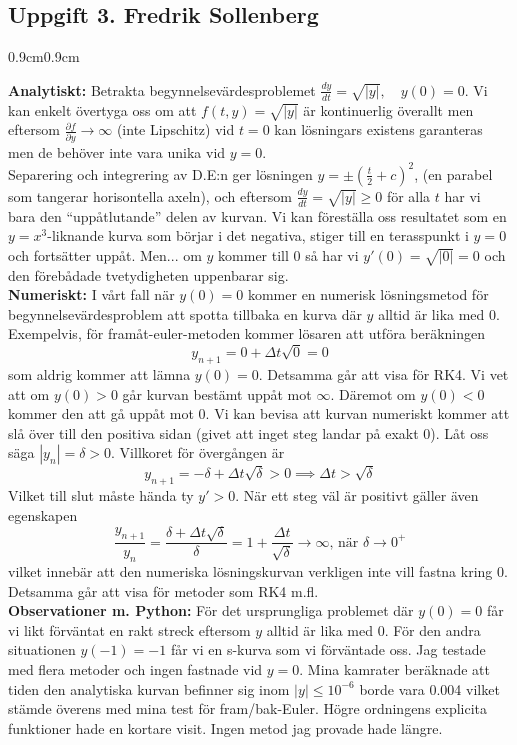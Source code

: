 \documentclass{article}
\begin{document}
\subsection*{Uppgift 3. Fredrik Sollenberg}
\begin{adjustwidth}{0.9cm}{0.9cm}

\textbf{Analytiskt:} Betrakta begynnelsevärdesproblemet $\frac{dy}{dt} = \sqrt{|y|},\quad y(0) = 0$. Vi kan enkelt övertyga oss om att $f(t,y)=\sqrt{|y|}$ är kontinuerlig överallt men eftersom $\frac{\partial f}{\partial y}\to \infty$ (inte Lipschitz) vid $t=0$ kan lösningars existens garanteras men de behöver inte vara unika vid $y=0$.
\medskip\\
Separering och integrering av D.E:n ger lösningen $y=\pm(\frac{t}{2}+c)^2$, (en parabel som tangerar horisontella axeln), och eftersom $\frac{dy}{dt} =\sqrt{|y|} \geq 0$ för alla $t$ har vi bara den ``uppåtlutande'' delen av kurvan. Vi kan föreställa oss resultatet som en $y=x^3$-liknande kurva som börjar i det negativa, stiger till en terasspunkt i $y=0$ och fortsätter uppåt. Men... om $y$ kommer till $0$ så har vi $y'(0)=\sqrt{|0|} = 0$ och den förebådade tvetydigheten uppenbarar sig. 
\medskip\\
\textbf{Numeriskt:} I vårt fall när $y(0)=0$ kommer en numerisk lösningsmetod för begynnelsevärdesproblem att spotta tillbaka en kurva där $y$ alltid är lika med $0$. Exempelvis, för framåt-euler-metoden kommer lösaren att utföra beräkningen
\[
y_{n+1} = 0 + \Delta t\sqrt{0} =0
\]
som aldrig kommer att lämna $y(0)=0$. Detsamma går att visa för RK4. Vi vet att om $y(0) > 0$ går kurvan bestämt uppåt mot $\infty$. Däremot om $y(0) < 0$ kommer den att gå uppåt mot $0$. Vi kan bevisa att kurvan numeriskt kommer att slå över till den positiva sidan (givet att inget steg landar på exakt $0$). Låt oss säga $|y_n| = \delta > 0$. Villkoret för övergången är
\[
y_{n+1} = -\delta + \Delta t\sqrt{\delta} > 0 \implies \Delta t>\sqrt{\delta}
\]
Vilket till slut måste hända ty $y' > 0$. När ett steg väl är positivt gäller även egenskapen
\[
\frac{y_{n+1}}{y_n} = \frac{\delta+\Delta t\sqrt{\delta}}{\delta} = 1 + \frac{\Delta t}{\sqrt{\delta}} \to \infty \text{, när } \delta \to 0^{+}
\]
vilket innebär att den numeriska lösningskurvan verkligen inte vill fastna kring $0$. Detsamma går att visa för metoder som RK4 m.fl.
\medskip\\
\textbf{Observationer m. Python:} För det ursprungliga problemet där $y(0)=0$ får vi likt förväntat en rakt streck eftersom $y$ alltid är lika med $0$. För den andra situationen $y(-1)=-1$ får vi en s-kurva som vi förväntade oss. Jag testade med flera metoder och ingen fastnade vid $y=0$. Mina kamrater beräknade att tiden den analytiska kurvan befinner sig inom $|y|\leq10^{-6}$ borde vara 0.004 vilket stämde överens med mina test för fram/bak-Euler. Högre ordningens explicita funktioner hade en kortare visit. Ingen metod jag provade hade längre. 
\end{adjustwidth}
\end{document}
